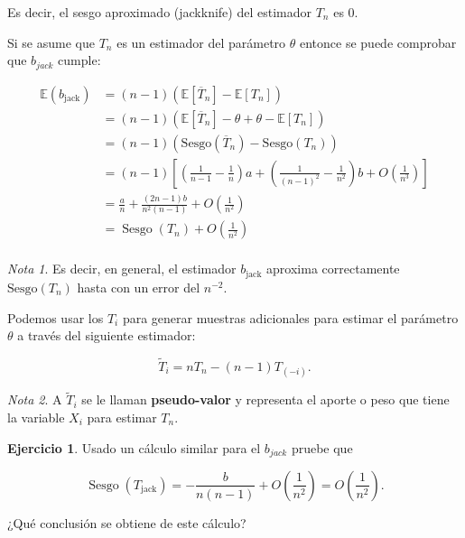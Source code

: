 \documentclass[
  12pt,
]{book}
\theoremstyle{definition}
\theoremstyle{definition}
\theoremstyle{definition}
\newtheorem{exercise}{Ejercicio}[chapter]
\theoremstyle{definition}
\theoremstyle{remark}
\newtheorem*{remark}{Nota}
\begin{document}
Es decir, el sesgo aproximado (jackknife) del estimador \(T_n\) es 0.

Si se asume que \(T_n\) es un estimador del parámetro \(\theta\) entonce se puede comprobar que \(b_{jack}\) cumple:

\begin{align*}
\mathbb{E}\left(b_{\text {jack}}\right)
&= (n-1)\left(\mathbb{E}\left[\overline{T}_{n}\right] -
\mathbb{E}\left[T_{n}\right]\right) \\
&= (n-1)\left(\mathbb{E}\left[\overline{T}_{n}\right] - \theta +
\theta - \mathbb{E}\left[T_{n}\right]\right) \\
& =(n-1)\left(\mathrm{Sesgo} \left(\overline{T}_{n}\right)
-\mathrm{Sesgo}\left(T_{n}\right)\right) \\
& =(n-1)\left[\left(\frac{1}{n-1}
-\frac{1}{n}\right)
a+\left(\frac{1}{(n-1)^{2}}
-\frac{1}{n^{2}}\right) b+O\left(\frac{1}{n^{3}}\right)\right] \\
& =\frac{a}{n}
+\frac{(2 n-1) b}{n^{2}(n-1)}
+O\left(\frac{1}{n^{2}}\right) \\
& =\operatorname{Sesgo}\left(T_{n}\right)
+O\left(\frac{1}{n^{2}}\right)\\
\end{align*}

\begin{remark}
Es decir, en general, el estimador \(b_{\text{jack}}\) aproxima
correctamente \(\mathrm{Sesgo}\left( T_{n} \right)\) hasta con un
error del \(n^{-2}\).
\end{remark}

Podemos usar los \(T_i\) para generar muestras adicionales para
estimar el parámetro \(\theta\) a través del siguiente estimador:

\[
\widetilde{T}_{i}=n T_{n}-(n-1) T_{(-i)}.
\]

\begin{remark}
A \(\widetilde{T}_{i}\) se le llaman \textbf{pseudo-valor} y
representa el aporte o peso que tiene la variable \(X_{i}\) para
estimar \(T_{n}\).
\end{remark}

\begin{exercise}
\protect\hypertarget{exr:unnamed-chunk-77}{}\label{exr:unnamed-chunk-77}Usado un cálculo similar para el \(b_{jack}\) pruebe que

\[
\operatorname{Sesgo}\left(T_{\text {jack}
}\right)=-\frac{b}{n(n-1)}+O\left(\frac{1}{n^{2}}\right)=O\left(\frac{1}{n^{2}}\right).
\]

¿Qué conclusión se obtiene de este cálculo?
\end{exercise}
\end{document}
